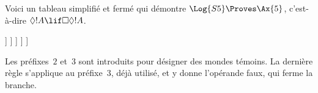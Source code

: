 \documentclass[../../../include/open-logic-section]{subfiles}
\begin{document}
\begin{ex}
  Voici un tableau simplifié et fermé qui démontre $\Log{S5} \Proves
  \Ax{5}$, c'est-à-dire $\Diamond!A \lif \Box\Diamond!A$.
  \begin{oltableau}
    [\pFmla{\False}{\Diamond\formula{A} \lif \Box\Diamond \formula{A}}{1},
      just = \TAss
      [\pFmla{\True}{\Diamond \formula{A}}{1}, just = {\TRule{\False}{\lif}[1]}
        [\pFmla{\False}{\Box\Diamond \formula{A}}{1},
          just = {\TRule{\False}{\lif}[1]}
          [\pFmla{\False}{\Diamond \formula{A}}{2},
            just = {\TRule{\False}{\Box}[3]}
            [\pFmla{\True}{\formula{A}}{3},
              just = {\TRule{\True}{\Diamond}[2]}
                [\pFmla{\False}{\formula{A}}{3},
                  just = {\TRule{\False}{\Diamond}[4]}, close]
            ]
          ]
        ]
      ]
    ]
  \end{oltableau}
  Les préfixes~$2$ et~$3$ sont introduits pour désigner des mondes
  témoins. La dernière règle s'applique au préfixe~$3$, déjà utilisé,
  et y donne l'opérande faux, qui ferme la branche.
\end{ex}
\end{document}
